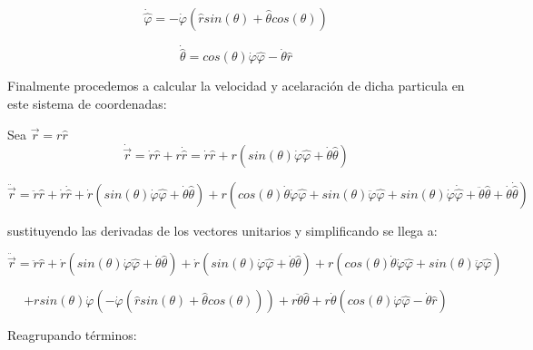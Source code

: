 \documentclass[12 pt]{article}
\begin{document}
 \begin{equation*}
 \dot{\hat{\varphi}}= - \dot{\varphi}\left( \hat{r} sin(\theta) +\hat{\theta}cos(\theta)  \right)
 \end{equation*}



\begin{equation*}
\dot{\hat{\theta}}= cos(\theta)\dot{\varphi}\hat{\varphi} - \dot{\theta} \hat{r}
\end{equation*}


Finalmente procedemos a calcular la velocidad y acelaración de dicha particula en este sistema de coordenadas:

Sea $\vec{r} = r \hat{r}$
\begin{equation*}
\dot{\vec{r}} = \dot{r} \hat{r} + r \dot{\hat{r}} = \dot{r} \hat{r} + r \left(sin(\theta)\dot{\varphi} \hat{\varphi} + \dot{\theta}\hat{\theta}\right)
\end{equation*}


\begin{equation*}
\ddot{\vec{r}} = \ddot{r}\hat{r} + \dot{r}\dot{\hat{r}} + \dot{r} \left(sin(\theta)\dot{\varphi} \hat{\varphi} + \dot{\theta}\hat{\theta}\right) + r \left(
cos(\theta)\dot{\theta}\dot{\varphi}\hat{\varphi} + sin(\theta)\ddot{\varphi}\hat{\varphi} + sin(\theta)\dot{\varphi}\dot{\hat{\varphi}} + \ddot{\theta}\hat{\theta}+ \dot{\theta}\dot{\hat{\theta}}\right)
\end{equation*}


sustituyendo las derivadas de los vectores unitarios y simplificando se llega a:

\begin{equation*}
\ddot{\vec{r}} = \ddot{r}\hat{r} + \dot{r} \left(sin(\theta)\dot{\varphi} \hat{\varphi} + \dot{\theta}\hat{\theta}\right) + \dot{r} \left(sin(\theta)\dot{\varphi} \hat{\varphi} + \dot{\theta}\hat{\theta}\right) + r (cos(\theta)\dot{\theta}\dot{\varphi}\hat{\varphi} + sin(\theta)\ddot{\varphi}\hat{\varphi}) 
\end{equation*}

\begin{equation*}
+ r sin(\theta)\dot{\varphi} \left( - \dot{\varphi}\left(\hat{r} sin(\theta) +\hat{\theta}cos(\theta)  \right) \right) + r\ddot{\theta} \hat{\theta}+ r\dot{\theta} \left(cos(\theta)\dot{\varphi}\hat{\varphi} - \dot{\theta} \hat{r}\right)
\end{equation*}



Reagrupando términos:
\end{document}
